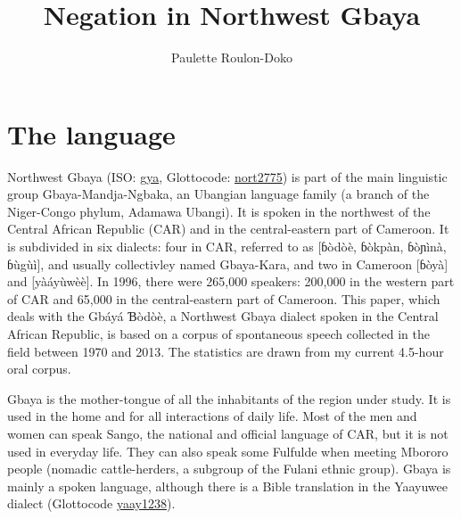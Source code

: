 \documentclass[output=paper,colorlinks=true, citecolor=brown]{langscibook}
\author{Paulette Roulon-Doko\affiliation{CNRS-LLACAN}}
\title{Negation in Northwest Gbaya}
\begin{document}
\maketitle 

\section{The language}\label{sec:gba:1}

Northwest Gbaya (ISO: \href{https://iso639-3.sil.org/code/gya}{gya}, Glottocode: \href{https://glottolog.org/resource/languoid/id/nort2775}{nort2775}) is part of the main linguistic group Gbaya-Mandja-Ngbaka, an Ubangian language family (a branch of the Niger-Congo phylum, Adamawa Ubangi). It is spoken in the northwest of the Central African Republic (CAR) and in the central{}-eastern part of Cameroon. It is subdivided in six dialects: four in CAR, referred to as [ɓòdòè, ɓòkpàn, ɓòɲìnà, ɓùgùì], and usually collectivley named Gbaya-Kara, and two in Cameroon [ɓòyà] and [yàáyùwèè]. In 1996, there were 265,000 speakers: 200,000 in the western part of CAR and 65,000 in the central-eastern part of Cameroon. This paper, which deals with the Gbáyá \MakeUppercase{ɓ}òdòè, a Northwest Gbaya dialect spoken in the Central African Republic, is based on a corpus of spontaneous speech collected in the field between 1970 and 2013. The statistics are drawn from my current 4.5-hour oral corpus.

Gbaya is the mother-tongue of all the inhabitants of the region under study. It is used in the home and for all interactions of daily life. Most of the men and women can speak Sango, the national and official language of CAR, but it is not used in everyday life. They can also speak some Fulfulde when meeting Mbororo people (nomadic cattle-herders, a subgroup of the Fulani ethnic group). Gbaya is mainly a spoken language, although there is a Bible translation in the Yaayuwee dialect (Glottocode \href{https://glottolog.org/resource/languoid/id/yaay1238}{yaay1238}).
\end{document}

